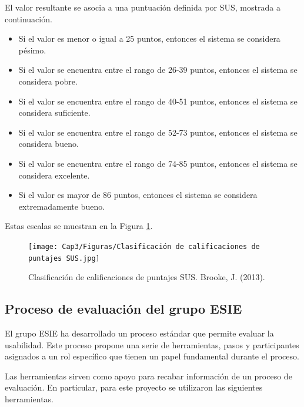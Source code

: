 El valor resultante se asocia a una puntuación definida por SUS, mostrada a continuación.

\begin{itemize}
  \item Si el valor es menor o igual a 25 puntos, entonces el sistema se considera pésimo.
  \item Si el valor se encuentra entre el rango de 26-39 puntos, entonces el sistema se considera pobre.
  \item Si el valor se encuentra entre el rango de 40-51 puntos, entonces el sistema se considera suficiente.
  \item Si el valor se encuentra entre el rango de 52-73 puntos, entonces el sistema se considera bueno.
  \item Si el valor se encuentra entre el rango de 74-85 puntos, entonces el sistema se considera excelente.
  \item Si el valor es mayor de 86 puntos, entonces el sistema se considera extremadamente bueno.
\end{itemize}

Estas escalas se muestran en la Figura \ref{fig:36}.

\begin{figure}[H]
  \centering
  \texttt{[image: Cap3/Figuras/Clasificación de calificaciones de puntajes SUS.jpg]}
  \caption{Clasificación de calificaciones de puntajes SUS. Brooke, J. (2013).}
  \label{fig:36}
\end{figure}


\subsection{Proceso de evaluación del grupo ESIE}
\label{ESIECap3}

El grupo ESIE ha desarrollado un proceso estándar que permite evaluar la usabilidad. Este proceso propone una serie de herramientas, pasos y participantes asignados a un rol específico que tienen un papel fundamental durante el proceso.

Las herramientas sirven como apoyo para recabar información de un proceso de evaluación. En particular, para este proyecto se utilizaron las siguientes herramientas.

